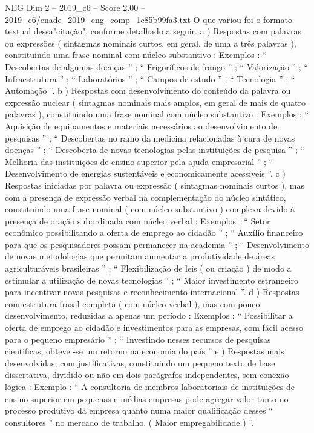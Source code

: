 \begin{textsample}{NEG Dim 2 – 2019\_c6 – Score 2.00 – 2019\_c6/enade\_2019\_eng\_comp\_1c85b99fa3.txt}
O que variou foi o formato textual dessa"citação", conforme detalhado a seguir. a ) Respostas com palavras ou expressões ( sintagmas nominais curtos, em geral, de uma a três palavras ), constituindo uma frase nominal com núcleo substantivo : Exemplos : “ Descobertas de algumas doenças ” ; “ Frigoríficos de frango ” ; “ Valorização ” ; “ Infraestrutura ” ; “ Laboratórios ” ; “ Campos de estudo ” ; “ Tecnologia ” ; “ Automação ”. b ) Respostas com desenvolvimento do conteúdo da palavra ou expressão nuclear ( sintagmas nominais mais amplos, em geral de mais de quatro palavras ), constituindo uma frase nominal com núcleo substantivo : Exemplos : “ Aquisição de equipamentos e materiais necessários ao desenvolvimento de pesquisas ” ; “ Descobertas no ramo da medicina relacionadas à cura de novas doenças ” ; “ Descoberta de novas tecnologias pelas instituições de pesquisa ” ; “ Melhoria das instituições de ensino superior pela ajuda empresarial ” ; “ Desenvolvimento de energias sustentáveis e economicamente acessíveis ”. c ) Respostas iniciadas por palavra ou expressão ( sintagmas nominais curtos ), mas com a presença de expressão verbal na complementação do núcleo sintático, constituindo uma frase nominal ( com núcleo substantivo ) complexa devido à presença de oração subordinada com núcleo verbal : Exemplos : “ Setor econômico possibilitando a oferta de emprego ao cidadão ” ; “ Auxílio financeiro para que os pesquisadores possam permanecer na academia ” ; “ Desenvolvimento de novas metodologias que permitam aumentar a produtividade de áreas agriculturáveis brasileiras ” ; “ Flexibilização de leis ( ou criação ) de modo a estimular a utilização de novas tecnologias ” ; “ Maior investimento estrangeiro para incentivar novas pesquisas e reconhecimento internacional ”. d ) Respostas com estrutura frasal completa ( com núcleo verbal ), mas com pouco desenvolvimento, reduzidas a apenas um período : Exemplos : “ Possibilitar a oferta de emprego ao cidadão e investimentos para as empresas, com fácil acesso para o pequeno empresário ” ; “ Investindo nesses recursos de pesquisas cientificas, obteve -se um retorno na economia do país ” e ) Respostas mais desenvolvidas, com justificativas, constituindo um pequeno texto de base dissertativa, dividido ou não em dois parágrafos independentes, sem conexão lógica : Exemplo : “ A consultoria de membros laboratoriais de instituições de ensino superior em pequenas e médias empresas pode agregar valor tanto no processo produtivo da empresa quanto numa maior qualificação desses “ consultores ” no mercado de trabalho. ( Maior empregabilidade ) ”.

\end{textsample}

